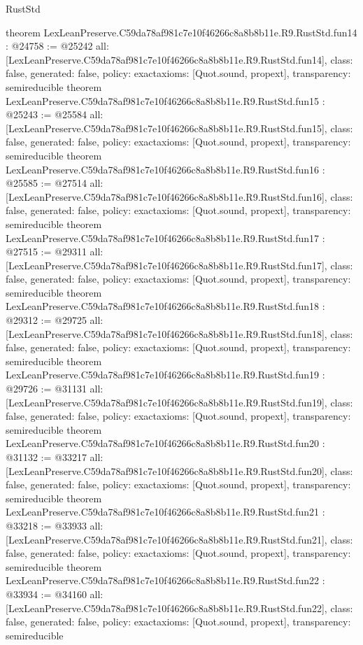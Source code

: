 \begin{lexlean}{RustStd}
\begin{coremodule}
{}
theorem LexLeanPreserve.C59da78af981c7e10f46266c8a8b8b11e.R9.RustStd.fun14 : @24758 := @25242 {
  all: [LexLeanPreserve.C59da78af981c7e10f46266c8a8b8b11e.R9.RustStd.fun14],
  class: false,
  generated: false,
  policy: exact{axioms: [Quot.sound, propext]},
  transparency: semireducible
}
theorem LexLeanPreserve.C59da78af981c7e10f46266c8a8b8b11e.R9.RustStd.fun15 : @25243 := @25584 {
  all: [LexLeanPreserve.C59da78af981c7e10f46266c8a8b8b11e.R9.RustStd.fun15],
  class: false,
  generated: false,
  policy: exact{axioms: [Quot.sound, propext]},
  transparency: semireducible
}
theorem LexLeanPreserve.C59da78af981c7e10f46266c8a8b8b11e.R9.RustStd.fun16 : @25585 := @27514 {
  all: [LexLeanPreserve.C59da78af981c7e10f46266c8a8b8b11e.R9.RustStd.fun16],
  class: false,
  generated: false,
  policy: exact{axioms: [Quot.sound, propext]},
  transparency: semireducible
}
theorem LexLeanPreserve.C59da78af981c7e10f46266c8a8b8b11e.R9.RustStd.fun17 : @27515 := @29311 {
  all: [LexLeanPreserve.C59da78af981c7e10f46266c8a8b8b11e.R9.RustStd.fun17],
  class: false,
  generated: false,
  policy: exact{axioms: [Quot.sound, propext]},
  transparency: semireducible
}
theorem LexLeanPreserve.C59da78af981c7e10f46266c8a8b8b11e.R9.RustStd.fun18 : @29312 := @29725 {
  all: [LexLeanPreserve.C59da78af981c7e10f46266c8a8b8b11e.R9.RustStd.fun18],
  class: false,
  generated: false,
  policy: exact{axioms: [Quot.sound, propext]},
  transparency: semireducible
}
theorem LexLeanPreserve.C59da78af981c7e10f46266c8a8b8b11e.R9.RustStd.fun19 : @29726 := @31131 {
  all: [LexLeanPreserve.C59da78af981c7e10f46266c8a8b8b11e.R9.RustStd.fun19],
  class: false,
  generated: false,
  policy: exact{axioms: [Quot.sound, propext]},
  transparency: semireducible
}
theorem LexLeanPreserve.C59da78af981c7e10f46266c8a8b8b11e.R9.RustStd.fun20 : @31132 := @33217 {
  all: [LexLeanPreserve.C59da78af981c7e10f46266c8a8b8b11e.R9.RustStd.fun20],
  class: false,
  generated: false,
  policy: exact{axioms: [Quot.sound, propext]},
  transparency: semireducible
}
theorem LexLeanPreserve.C59da78af981c7e10f46266c8a8b8b11e.R9.RustStd.fun21 : @33218 := @33933 {
  all: [LexLeanPreserve.C59da78af981c7e10f46266c8a8b8b11e.R9.RustStd.fun21],
  class: false,
  generated: false,
  policy: exact{axioms: [Quot.sound, propext]},
  transparency: semireducible
}
theorem LexLeanPreserve.C59da78af981c7e10f46266c8a8b8b11e.R9.RustStd.fun22 : @33934 := @34160 {
  all: [LexLeanPreserve.C59da78af981c7e10f46266c8a8b8b11e.R9.RustStd.fun22],
  class: false,
  generated: false,
  policy: exact{axioms: [Quot.sound, propext]},
  transparency: semireducible
}
\end{coremodule}
\end{lexlean}
